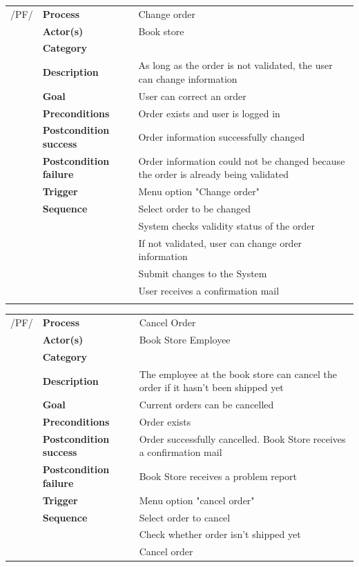 \documentclass[11pt,a4paper,oneside,svgnames]{report}
\begin{document}
\noindent
\begin{tabular}{p{1.5cm}p{3cm}p{8cm}}
/PF/	& \textbf{Process} & Change order\\
		& \textbf{Actor(s)} & Book store\\
		& \textbf{Category} & \\
		& \textbf{Description}	 & As long as the order is not validated, the user can change information\\
		& \textbf{Goal} & User can correct an order\\
		& \textbf{Preconditions} & Order exists and user is logged in\\
		& \textbf{Postcondition success} & Order information successfully changed\\
		& \textbf{Postcondition failure} & Order information could not be changed because the order is already being validated\\
		& \textbf{Trigger} & Menu option "Change order"\\
		& \textbf{Sequence} & Select order to be changed\\
		& & System checks validity status of the order\\
		& & If not validated, user can change order information\\
		& & Submit changes to the System\\
		& & User receives a confirmation mail\\
		
\hfill \\
\end{tabular}

\noindent
\begin{tabular}{p{1.5cm}p{3cm}p{8cm}}
/PF/	& \textbf{Process} & Cancel Order\\
		& \textbf{Actor(s)} & Book Store Employee\\
		& \textbf{Category} & \\
		& \textbf{Description}	 & The employee at the book store can cancel the order if it hasn’t been shipped yet\\
		& \textbf{Goal} & Current orders can be cancelled\\
		& \textbf{Preconditions} & Order exists\\
		& \textbf{Postcondition success} & Order successfully cancelled. Book Store receives a confirmation mail\\
		& \textbf{Postcondition failure} & Book Store receives a problem report\\
		& \textbf{Trigger} & Menu option "cancel order"\\
		& \textbf{Sequence} & Select order to cancel\\
		& & Check whether order isn't shipped yet\\
		& & Cancel order
		
\hfill \\
\end{tabular}
\end{document}
